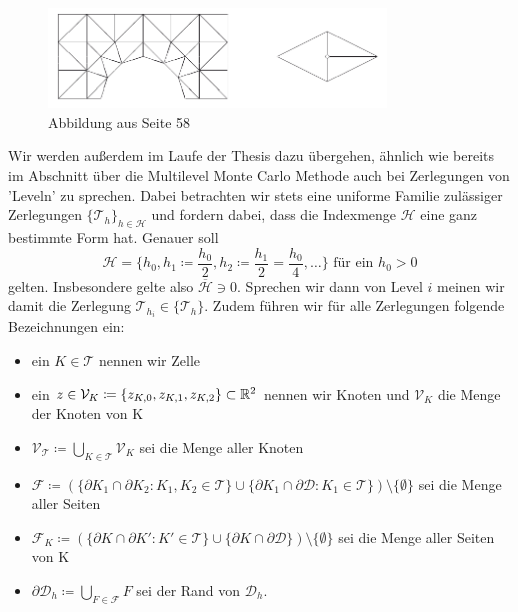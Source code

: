 \begin{figure}[H]
	\centering
	\includegraphics[width=0.8\textwidth]{triangulierung.png} \\
	Abbildung aus \cite{braess2013finite} Seite 58
\end{figure}
Wir werden außerdem im Laufe der Thesis dazu übergehen, ähnlich wie bereits im Abschnitt über die Multilevel Monte Carlo Methode auch bei Zerlegungen von 'Leveln' zu sprechen. Dabei betrachten wir stets eine uniforme Familie zulässiger Zerlegungen $ \{\mathcal{T}_h\}_{h \in \mathcal{H}} $ und fordern dabei, dass die Indexmenge $ \mathcal{H} $ eine ganz bestimmte Form hat. Genauer soll \[ \mathcal{H} = \{ h_0 , h_1 \coloneqq \frac{h_0}{2},h_2 \coloneqq \frac{h_1}{2} = \frac{h_0}{4}, \dots \}  \text{ für ein }  h_0 > 0  \] gelten. Insbesondere gelte also $ \overline{\mathcal{H}} \ni 0 $. Sprechen wir dann von Level $ i $ meinen wir damit die Zerlegung $\mathcal{T}_{h_i} \in \{\mathcal{T}_h\}$.
Zudem führen wir für alle Zerlegungen folgende Bezeichnungen ein:
\begin{itemize}
	\item ein $ K \in \mathcal{T} $ nennen wir Zelle
	\item ein $ z \in \mathcal{V}_K \coloneqq \{ z_{K,0} , z_{K,1} , z_{K,2}\} \subset \mathbb{R}^2 $ nennen wir Knoten und $\mathcal{V}_K$ die Menge der Knoten von K
	\item $ \mathcal{V}_{\mathcal{T}} \coloneqq \bigcup_{K \in \mathcal{T}} \mathcal{V}_K $ sei die Menge aller Knoten
	\item $\mathcal{F}  \coloneqq (\{ \partial K_1 \cap \partial K_2 : K_1,K_2 \in \mathcal{T} \} \cup \{ \partial K_1 \cap \partial \mathcal{D} : K_1 \in \mathcal{T} \}) \setminus \{\emptyset\} $ sei die Menge aller Seiten
	\item $ \mathcal{F}_K \coloneqq (\{ \partial K \cap \partial K' : K' \in \mathcal{T} \} \cup \{ \partial K \cap \partial \mathcal{D} \}) \setminus \{ \emptyset \} $ sei die Menge aller Seiten von K 
	\item $ \partial \mathcal{D}_h \coloneqq \bigcup_{F \in \mathcal{F}} F $ sei der Rand von $ \mathcal{D}_h $.
\end{itemize}


